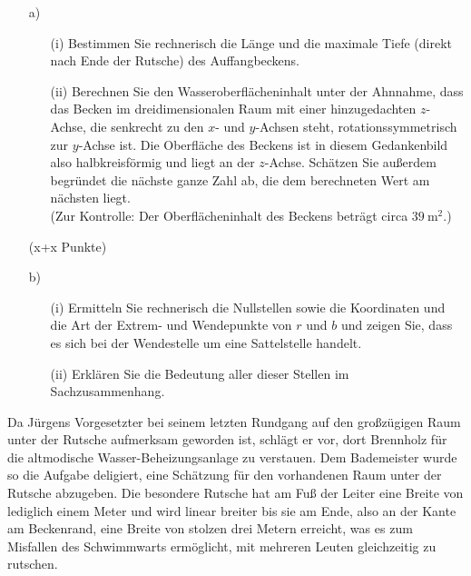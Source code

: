 \documentclass[ngerman, a4paper, 12pt]{article}
\begin{document}
\begin{enumerate}
    \item[a)]
        \begin{enumerate}
            \item[(i)]
                Bestimmen Sie rechnerisch die Länge und die maximale Tiefe (direkt nach Ende der Rutsche) des Auffangbeckens.
            \item[(ii)]
                Berechnen Sie den Wasseroberflächeninhalt unter der Ahnnahme,
                dass das Becken im dreidimensionalen Raum mit einer hinzugedachten $z$-Achse,
                die senkrecht zu den $x$- und $y$-Achsen steht, rotationssymmetrisch zur $y$-Achse ist.
                Die Oberfläche des Beckens ist in diesem Gedankenbild also halbkreisförmig und liegt an der $z$-Achse.
                Schätzen Sie außerdem begründet die nächste ganze Zahl ab, die dem berechneten Wert am nächsten liegt.\\
                (Zur Kontrolle: Der Oberflächeninhalt des Beckens beträgt circa $\SI{39}{\square\metre}$.)
        \end{enumerate}
        \begin{flushright}
            (x+x Punkte)
        \end{flushright}
    \item[b)]
        \begin{enumerate}
            \item[(i)]
                Ermitteln Sie rechnerisch die Nullstellen
                sowie die Koordinaten und die Art der Extrem- und Wendepunkte von $r$ und $b$
                und zeigen Sie, dass es sich bei der Wendestelle um eine Sattelstelle handelt.
            \item[(ii)]
                Erklären Sie die Bedeutung aller dieser Stellen im Sachzusammenhang.
        \end{enumerate}
\end{enumerate}

Da Jürgens Vorgesetzter bei seinem letzten Rundgang auf den großzügigen Raum unter der Rutsche aufmerksam geworden ist,
schlägt er vor, dort Brennholz für die altmodische Wasser-Beheizungsanlage zu verstauen.
Dem Bademeister wurde so die Aufgabe deligiert, eine Schätzung für den vorhandenen Raum unter der Rutsche abzugeben.
Die besondere Rutsche hat am Fuß der Leiter eine Breite von lediglich einem Meter und wird linear breiter
bis sie am Ende, also an der Kante am Beckenrand, eine Breite von stolzen drei Metern erreicht,
was es zum Misfallen des Schwimmwarts ermöglicht, mit mehreren Leuten gleichzeitig zu rutschen.
\end{document}
